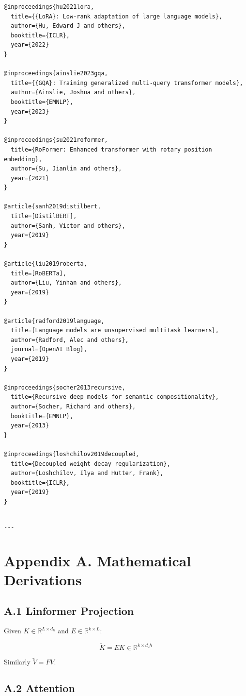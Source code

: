 \begin{lstlisting}
@inproceedings{hu2021lora,
  title={{LoRA}: Low-rank adaptation of large language models},
  author={Hu, Edward J and others},
  booktitle={ICLR},
  year={2022}
}

@inproceedings{ainslie2023gqa,
  title={{GQA}: Training generalized multi-query transformer models},
  author={Ainslie, Joshua and others},
  booktitle={EMNLP},
  year={2023}
}

@inproceedings{su2021roformer,
  title={RoFormer: Enhanced transformer with rotary position embedding},
  author={Su, Jianlin and others},
  year={2021}
}

@article{sanh2019distilbert,
  title=[DistilBERT],
  author={Sanh, Victor and others},
  year={2019}
}

@article{liu2019roberta,
  title=[RoBERTa],
  author={Liu, Yinhan and others},
  year={2019}
}

@article{radford2019language,
  title={Language models are unsupervised multitask learners},
  author={Radford, Alec and others},
  journal={OpenAI Blog},
  year={2019}
}

@inproceedings{socher2013recursive,
  title={Recursive deep models for semantic compositionality},
  author={Socher, Richard and others},
  booktitle={EMNLP},
  year={2013}
}

@inproceedings{loshchilov2019decoupled,
  title={Decoupled weight decay regularization},
  author={Loshchilov, Ilya and Hutter, Frank},
  booktitle={ICLR},
  year={2019}
}
\end{lstlisting}
\begin{lstlisting}

---
\end{lstlisting}

\section{Appendix A. Mathematical Derivations}

\subsection{A.1 Linformer Projection}

Given $K \in \mathbb{R}^{L \times d_h}$ and $E \in \mathbb{R}^{k \times L}$:

\[
\tilde{K} = E K \in \mathbb{R}^{k \times d\_h}
\tag{A.1}
\]

Similarly $\tilde{V} = F V$.

\subsection{A.2 Attention}

